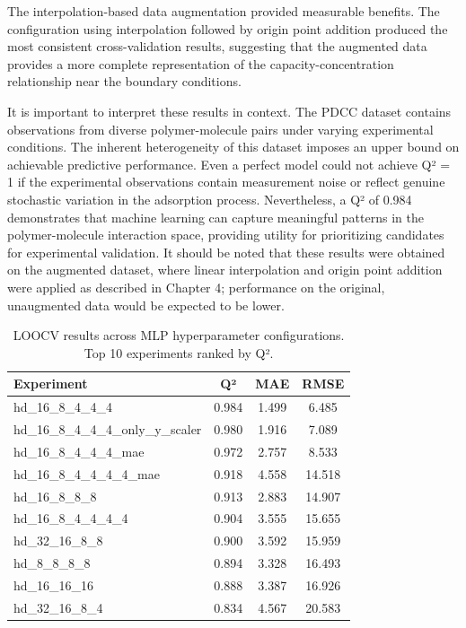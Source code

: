 The interpolation-based data augmentation provided measurable benefits. The configuration using interpolation followed by origin point addition produced the most consistent cross-validation results, suggesting that the augmented data provides a more complete representation of the capacity-concentration relationship near the boundary conditions.

It is important to interpret these results in context. The PDCC dataset contains observations from diverse polymer-molecule pairs under varying experimental conditions. The inherent heterogeneity of this dataset imposes an upper bound on achievable predictive performance. Even a perfect model could not achieve Q² = 1 if the experimental observations contain measurement noise or reflect genuine stochastic variation in the adsorption process. Nevertheless, a Q² of 0.984 demonstrates that machine learning can capture meaningful patterns in the polymer-molecule interaction space, providing utility for prioritizing candidates for experimental validation. It should be noted that these results were obtained on the augmented dataset, where linear interpolation and origin point addition were applied as described in Chapter 4; performance on the original, unaugmented data would be expected to be lower.

\begin{table}[htbp]
	\centering
	\caption{LOOCV results across MLP hyperparameter configurations. Top 10 experiments ranked by Q².}
	\label{tab:q2_leaderboard}
	\begin{tabular}{lccc}
		\toprule
		\textbf{Experiment}                 & \textbf{Q²} & \textbf{MAE} & \textbf{RMSE} \\
		\midrule
		hd\_16\_8\_4\_4\_4                  & 0.984       & 1.499        & 6.485         \\
		hd\_16\_8\_4\_4\_4\_only\_y\_scaler & 0.980       & 1.916        & 7.089         \\
		hd\_16\_8\_4\_4\_4\_mae             & 0.972       & 2.757        & 8.533         \\
		hd\_16\_8\_4\_4\_4\_4\_mae          & 0.918       & 4.558        & 14.518        \\
		hd\_16\_8\_8\_8                     & 0.913       & 2.883        & 14.907        \\
		hd\_16\_8\_4\_4\_4\_4               & 0.904       & 3.555        & 15.655        \\
		hd\_32\_16\_8\_8                    & 0.900       & 3.592        & 15.959        \\
		hd\_8\_8\_8\_8                      & 0.894       & 3.328        & 16.493        \\
		hd\_16\_16\_16                      & 0.888       & 3.387        & 16.926        \\
		hd\_32\_16\_8\_4                    & 0.834       & 4.567        & 20.583        \\
		\bottomrule
	\end{tabular}
\end{table}

